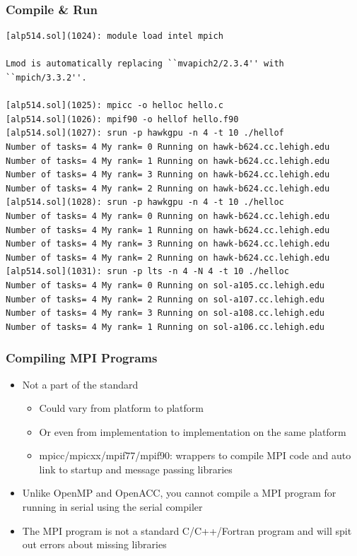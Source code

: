\documentclass[10pt,t]{beamer}
\begin{document}
\begin{frame}[fragile]
  \frametitle{Compile \& Run}
  \begin{exampleblock}{}
    \begin{lstlisting}[basicstyle=\scriptsize\ttfamily]
[alp514.sol](1024): module load intel mpich

Lmod is automatically replacing ``mvapich2/2.3.4'' with ``mpich/3.3.2''.

[alp514.sol](1025): mpicc -o helloc hello.c
[alp514.sol](1026): mpif90 -o hellof hello.f90
[alp514.sol](1027): srun -p hawkgpu -n 4 -t 10 ./hellof
Number of tasks= 4 My rank= 0 Running on hawk-b624.cc.lehigh.edu
Number of tasks= 4 My rank= 1 Running on hawk-b624.cc.lehigh.edu
Number of tasks= 4 My rank= 3 Running on hawk-b624.cc.lehigh.edu
Number of tasks= 4 My rank= 2 Running on hawk-b624.cc.lehigh.edu
[alp514.sol](1028): srun -p hawkgpu -n 4 -t 10 ./helloc
Number of tasks= 4 My rank= 0 Running on hawk-b624.cc.lehigh.edu
Number of tasks= 4 My rank= 1 Running on hawk-b624.cc.lehigh.edu
Number of tasks= 4 My rank= 3 Running on hawk-b624.cc.lehigh.edu
Number of tasks= 4 My rank= 2 Running on hawk-b624.cc.lehigh.edu
[alp514.sol](1031): srun -p lts -n 4 -N 4 -t 10 ./helloc
Number of tasks= 4 My rank= 0 Running on sol-a105.cc.lehigh.edu
Number of tasks= 4 My rank= 2 Running on sol-a107.cc.lehigh.edu
Number of tasks= 4 My rank= 3 Running on sol-a108.cc.lehigh.edu
Number of tasks= 4 My rank= 1 Running on sol-a106.cc.lehigh.edu
    \end{lstlisting}
  \end{exampleblock}
\end{frame}

\begin{frame}
  \frametitle{Compiling MPI Programs}
  \begin{itemize}
    \item Not a part of the standard
      \begin{itemize}
        \item Could vary from platform to platform
        \item Or even from implementation to implementation on the same  platform
        \item mpicc/mpicxx/mpif77/mpif90: wrappers to compile MPI code and auto 
          link to startup and message passing libraries 
      \end{itemize}
    \item<2> \alert<2>{Unlike OpenMP and OpenACC, you cannot compile a MPI program 
      for running in serial using the serial compiler}
    \item<2> \alert<2>{The MPI program is not a standard C/C++/Fortran program and 
      will spit out errors about missing libraries} 
  \end{itemize}
\end{frame}
\end{document}
